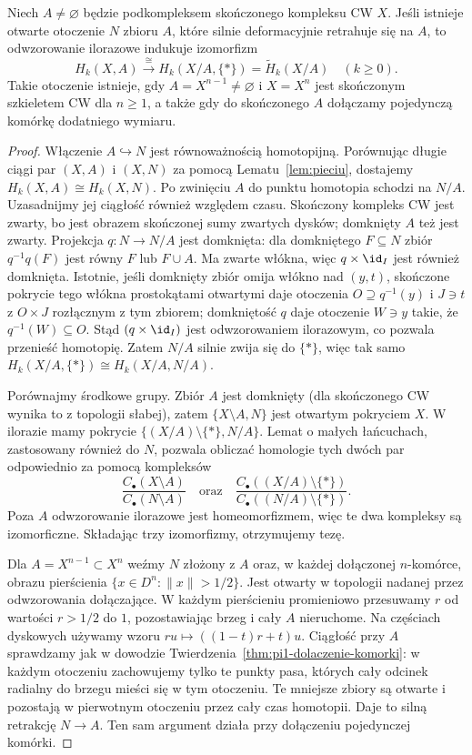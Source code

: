\begin{lemat}
\label{lem:iloraz-cw-homologia}
Niech $A\ne\varnothing$ będzie podkompleksem skończonego
kompleksu CW $X$. Jeśli istnieje otwarte
otoczenie $N$ zbioru $A$, które silnie
deformacyjnie retrahuje się na $A$, to
odwzorowanie ilorazowe indukuje izomorfizm
\[
 H_k(X,A)\xrightarrow{\ \cong\ }
 H_k(X/A,\{*\})=\widetilde H_k(X/A)
 \quad(k\geq0).
\]
Takie otoczenie istnieje, gdy
$A=X^{n-1}\ne\varnothing$ i $X=X^n$ jest skończonym
szkieletem CW dla $n\geq1$, a także gdy do skończonego $A$
dołączamy pojedynczą komórkę dodatniego wymiaru.
\end{lemat}
\begin{proof}
Włączenie $A\hookrightarrow N$ jest
równoważnością homotopijną. Porównując
długie ciągi par $(X,A)$ i $(X,N)$
za pomocą Lematu~\ref{lem:pieciu},
dostajemy $H_k(X,A)\cong H_k(X,N)$.
Po zwinięciu $A$ do punktu homotopia schodzi na $N/A$.
Uzasadnijmy jej ciągłość również względem czasu.
Skończony kompleks CW jest zwarty, bo jest obrazem skończonej
sumy zwartych dysków; domknięty $A$ też jest zwarty.
Projekcja $q:N\to N/A$ jest domknięta: dla domkniętego $F\subseteq N$
zbiór $q^{-1}q(F)$ jest równy $F$ lub $F\cup A$.
Ma zwarte włókna, więc $q\times\id_I$ jest również domknięta.
Istotnie, jeśli domknięty zbiór omija włókno nad $(y,t)$,
skończone pokrycie tego włókna prostokątami otwartymi daje
otoczenia $O\supseteq q^{-1}(y)$ i $J\ni t$ z $O\times J$
rozłącznym z tym zbiorem; domkniętość $q$ daje otoczenie
$W\ni y$ takie, że $q^{-1}(W)\subseteq O$.
Stąd $(q\times\id_I)$ jest odwzorowaniem ilorazowym,
co pozwala przenieść homotopię. Zatem $N/A$ silnie zwija się do $\{*\}$,
więc tak samo
$H_k(X/A,\{*\})\cong H_k(X/A,N/A)$.

Porównajmy środkowe grupy.
Zbiór $A$ jest domknięty
(dla skończonego CW wynika to
z topologii słabej), zatem
$\{X\setminus A,N\}$ jest
otwartym pokryciem $X$.
W ilorazie mamy pokrycie
$\{(X/A)\setminus\{*\},N/A\}$.
Lemat o małych łańcuchach,
zastosowany również do $N$,
pozwala obliczać homologie
tych dwóch par odpowiednio za pomocą kompleksów
\[
 \frac{C_\bullet(X\setminus A)}
      {C_\bullet(N\setminus A)}
 \quad\text{oraz}\quad
 \frac{C_\bullet((X/A)\setminus\{*\})}
      {C_\bullet((N/A)\setminus\{*\})}.
\]
Poza $A$ odwzorowanie ilorazowe jest
homeomorfizmem, więc te dwa
kompleksy są izomorficzne.
Składając trzy izomorfizmy,
otrzymujemy tezę.

Dla $A=X^{n-1}\subset X^n$
weźmy $N$ złożony z $A$ oraz,
w każdej dołączonej $n$-komórce,
obrazu pierścienia
$\{x\in D^n:\|x\|>1/2\}$.
Jest otwarty w topologii
nadanej przez odwzorowania dołączające.
W każdym pierścieniu promieniowo
przesuwamy $r$ od wartości
$r>1/2$ do $1$, pozostawiając
brzeg i cały $A$ nieruchome.
Na częściach dyskowych używamy wzoru
$ru\mapsto((1-t)r+t)u$. Ciągłość przy $A$ sprawdzamy jak
w dowodzie Twierdzenia~\ref{thm:pi1-dolaczenie-komorki}:
w każdym otoczeniu zachowujemy tylko te punkty pasa, których
cały odcinek radialny do brzegu mieści się w tym otoczeniu.
Te mniejsze zbiory są otwarte i pozostają w pierwotnym otoczeniu
przez cały czas homotopii. Daje to silną retrakcję $N\to A$.
Ten sam argument działa przy dołączeniu pojedynczej komórki.
\end{proof}

